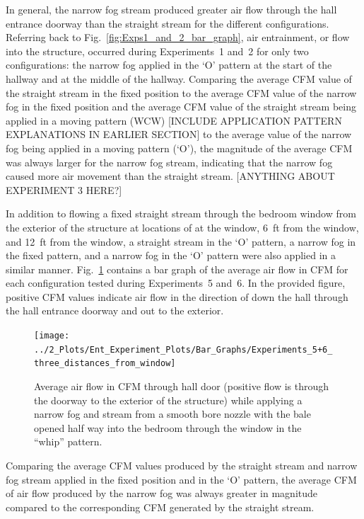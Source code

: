 \documentclass[12pt,oneside]{book}
\begin{document}
In general, the narrow fog stream produced greater air flow through the hall entrance doorway than the straight stream for the different configurations. Referring back to Fig.~\ref{fig:Exps1_and_2_bar_graph}, air entrainment, or flow into the structure, occurred during Experiments~1 and~2 for only two configurations: the narrow fog applied in the `O' pattern at the start of the hallway and at the middle of the hallway. Comparing the average CFM value of the straight stream in the fixed position to the average CFM value of the narrow fog in the fixed position and the average CFM value of the straight stream being applied in a moving pattern (WCW) [INCLUDE APPLICATION PATTERN EXPLANATIONS IN EARLIER SECTION] to the average value of the narrow fog being applied in a moving pattern (`O'), the magnitude of the average CFM was always larger for the narrow fog stream, indicating that the narrow fog caused more air movement than the straight stream. [ANYTHING ABOUT EXPERIMENT 3 HERE?] 

In addition to flowing a fixed straight stream through the bedroom window from the exterior of the structure at locations of at the window, 6~ft from the window, and 12~ft from the window, a straight stream in the `O' pattern, a narrow fog in the fixed pattern, and a narrow fog in the `O' pattern were also applied in a similar manner. Fig.~\ref{fig:Exps5_and_6_three_distances} contains a bar graph of the average air flow in CFM for each configuration tested during Experiments~5 and~6. In the provided figure, positive CFM values indicate air flow in the direction of down the hall through the hall entrance doorway and out to the exterior.

\begin{figure}[!ht]
	\centering
	\texttt{[image: ../2\_Plots/Ent\_Experiment\_Plots/Bar\_Graphs/Experiments\_5+6\_three\_distances\_from\_window]}
	\caption{Average air flow in CFM through hall door (positive flow is through the doorway to the exterior of the structure) while applying a narrow fog and stream from a smooth bore nozzle with the bale opened half way into the bedroom through the window in the ``whip'' pattern.}
	\label{fig:Exps5_and_6_three_distances}
\end{figure}

Comparing the average CFM values produced by the straight stream and narrow fog stream applied in the fixed position and in the `O' pattern, the average CFM of air flow produced by the narrow fog was always greater in magnitude compared to the corresponding CFM generated by the straight stream.
\end{document}
